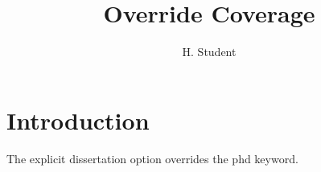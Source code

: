 \documentclass[phd,dissertation,12pt,a4paper]{bangor}
\title{Override Coverage}
\author{H. Student}
\begin{document}
\maketitle
{}
\chapter{Introduction}
The explicit dissertation option overrides the phd keyword.
\end{document}
